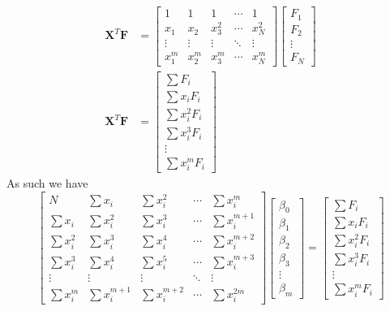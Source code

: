 \documentclass[../../../main.tex]{subfiles}
\begin{document}
\begin{align*}
    \mathbf{X}^T \mathbf{F} & =
    \begin{bmatrix}
        1      & 1      & 1      & \cdots & 1      \\
        x_1    & x_2    & x_3^2  & \cdots & x_N^2  \\
        \vdots & \vdots & \vdots & \ddots & \vdots \\
        x_1^m  & x_2^m  & x_3^m  & \cdots & x_N^m
    \end{bmatrix}
    \begin{bmatrix}
        F_1 \\ F_2 \\ \vdots \\ F_N
    \end{bmatrix}  \\
    \mathbf{X}^T \mathbf{F} & =
    \begin{bmatrix}
        \sum F_i \\ \sum x_i F_i \\ \sum x_i^2 F_i \\ \sum x_i^3 F_i \\ \vdots \\ \sum x_i^m F_i
    \end{bmatrix}
\end{align*}
As such we have
\begin{equation*}
    \begin{bmatrix}
        N            & \sum x_i       & \sum x_i^2     & \cdots & \sum x_i^m     \\
        \sum x_i     & \sum x_i^2     & \sum x_i^3     & \cdots & \sum x_i^{m+1} \\
        \sum x_i^2   & \sum x_i^3     & \sum x_i^4     & \cdots & \sum x_i^{m+2} \\
        \sum x_i^3   & \sum x_i^4     & \sum x_i^5     & \cdots & \sum x_i^{m+3} \\
        \vdots       & \vdots         & \vdots         & \ddots & \vdots         \\
        \sum x_i^{m} & \sum x_i^{m+1} & \sum x_i^{m+2} & \cdots & \sum x_i^{2m}
    \end{bmatrix}
    \begin{bmatrix}
        \beta_0 \\
        \beta_1 \\
        \beta_2 \\
        \beta_3 \\
        \vdots  \\
        \beta_m
    \end{bmatrix}
    =
    \begin{bmatrix}
        \sum F_i \\ \sum x_i F_i \\ \sum x_i^2 F_i \\ \sum x_i^3 F_i \\ \vdots \\ \sum x_i^m F_i
    \end{bmatrix}
\end{equation*}
\end{document}
